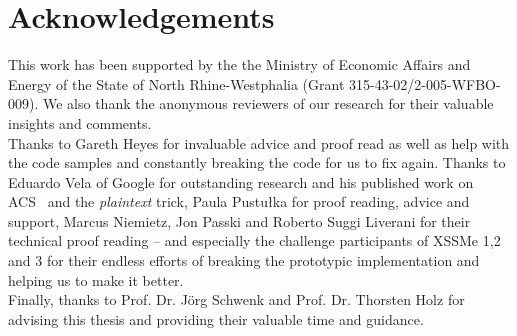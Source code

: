 \section{Acknowledgements}
\label{sec:8.acknowledgements}

This work has been supported by the the Ministry of Economic Affairs and Energy of the State of North Rhine-Westphalia (Grant 315-43-02/2-005-WFBO-009). We also thank the anonymous reviewers of our research for their valuable insights and comments. \\

Thanks to Gareth Heyes for invaluable advice and proof read as well as help with the code samples and constantly breaking the code for us to fix again. Thanks to Eduardo Vela of Google for outstanding research and his published work on ACS~\cite{vela_nava_acs_2006} and the \textit{plaintext} trick, Paula Pustułka for proof reading, advice and support, Marcus Niemietz, Jon Passki and Roberto Suggi Liverani for their technical proof reading -- and especially the challenge participants of XSSMe 1,2 and 3 for their endless efforts of breaking the prototypic implementation and helping us to make it better.\\

Finally, thanks to Prof. Dr. Jörg Schwenk and Prof. Dr. Thorsten Holz for advising this thesis and providing their valuable time and guidance.
